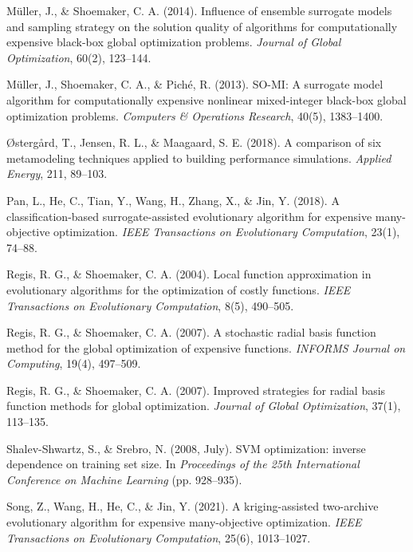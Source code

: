 \documentclass[sigconf,nonacm]{acmart}
\begin{document}
\begin{enumerate}[label={[\arabic*]}]
\item Müller, J., \& Shoemaker, C. A. (2014). Influence of ensemble surrogate models and sampling strategy on the solution quality of algorithms for computationally expensive black-box global optimization problems. \textit{Journal of Global Optimization}, 60(2), 123--144.

\item Müller, J., Shoemaker, C. A., \& Piché, R. (2013). SO-MI: A surrogate model algorithm for computationally expensive nonlinear mixed-integer black-box global optimization problems. \textit{Computers \& Operations Research}, 40(5), 1383--1400.

\item Østergård, T., Jensen, R. L., \& Maagaard, S. E. (2018). A comparison of six metamodeling techniques applied to building performance simulations. \textit{Applied Energy}, 211, 89--103.

\item Pan, L., He, C., Tian, Y., Wang, H., Zhang, X., \& Jin, Y. (2018). A classification-based surrogate-assisted evolutionary algorithm for expensive many-objective optimization. \textit{IEEE Transactions on Evolutionary Computation}, 23(1), 74--88.

\item Regis, R. G., \& Shoemaker, C. A. (2004). Local function approximation in evolutionary algorithms for the optimization of costly functions. \textit{IEEE Transactions on Evolutionary Computation}, 8(5), 490--505.

\item Regis, R. G., \& Shoemaker, C. A. (2007). A stochastic radial basis function method for the global optimization of expensive functions. \textit{INFORMS Journal on Computing}, 19(4), 497--509.

\item Regis, R. G., \& Shoemaker, C. A. (2007). Improved strategies for radial basis function methods for global optimization. \textit{Journal of Global Optimization}, 37(1), 113--135.

\item Shalev-Shwartz, S., \& Srebro, N. (2008, July). SVM optimization: inverse dependence on training set size. In \textit{Proceedings of the 25th International Conference on Machine Learning} (pp. 928--935).

\item Song, Z., Wang, H., He, C., \& Jin, Y. (2021). A kriging-assisted two-archive evolutionary algorithm for expensive many-objective optimization. \textit{IEEE Transactions on Evolutionary Computation}, 25(6), 1013--1027.


\end{enumerate}
\end{document}
